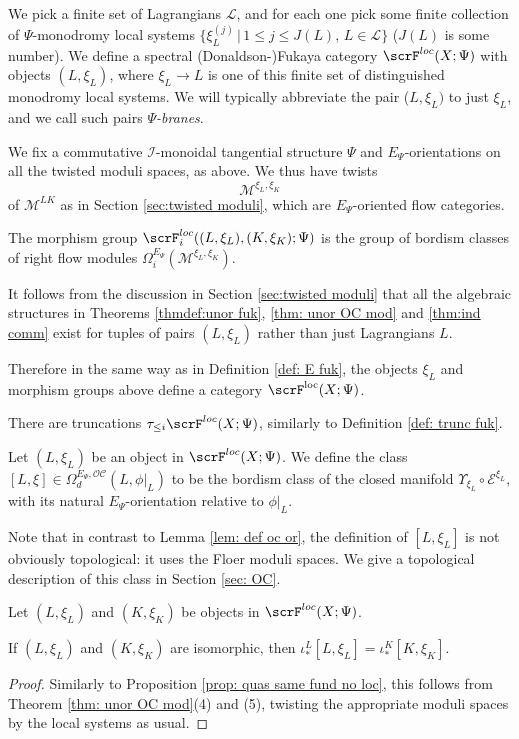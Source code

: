 \documentclass{TPmod}
\DeclareMathOperator{\loc}{loc}
\newcommand{\cC}{\mathcal{C}}
\newcommand{\cE}{\mathcal{E}}
\newcommand{\cI}{\mathcal{I}}
\newcommand{\cL}{\mathcal{L}}
\newcommand{\cM}{\mathcal{M}}
\newcommand{\cO}{\mathcal{O}}
\numberwithin{equation}{section}
\begin{document}
We pick a finite set of Lagrangians $\cL$, and for each one pick some finite collection of $\Psi$-monodromy local systems $\{\xi^{(j)}_L \, | \,  1 \leq j \leq J(L), \, L \in \cL\}$ ($J(L)$ is some number).  We define a spectral (Donaldson-)Fukaya category $\scrF^{loc}(X; \Psi)$ with objects $(L,\xi_L)$, where $\xi_L \to L$ is one of this finite set of distinguished monodromy local systems. We will typically abbreviate the pair ($L,\xi_L)$ to just $\xi_L$, and we call such pairs \emph{$\Psi$-branes}.

We fix a commutative $\cI$-monoidal tangential structure $\Psi$ and $E_\Psi$-orientations on all the twisted moduli spaces, as above. We thus have twists
\[
\cM^{\xi_L,\xi_K}
\]
of $\cM^{LK}$ as in Section \ref{sec:twisted moduli}, which are $E_\Psi$-oriented flow categories.

\begin{defn}
    The morphism group $\scrF^{loc}_i((L,\xi_L), (K,\xi_K); \Psi)$ is the group of bordism classes of right flow modules $\Omega_i^{E_\Psi}(\cM^{\xi_L,\xi_K})$.
\end{defn}

It follows from the discussion in Section \ref{sec:twisted moduli} that all the algebraic structures in Theorems \ref{thmdef:unor fuk}, \ref{thm: unor OC mod} and \ref{thm:ind comm} exist for tuples of pairs $(L, \xi_L)$ rather than just Lagrangians $L$.


Therefore in the same way as in Definition \ref{def: E fuk}, the objects $\xi_L$ and morphism groups above define a category $\scrF^{\loc}(X;\Psi)$.

There are truncations $\tau_{\leq i} \scrF^{loc}(X; \Psi)$, similarly to Definition \ref{def: trunc fuk}.

\begin{defn}\label{def: oc loco}
    Let $(L, \xi_L)$ be an object in $\scrF^{loc}(X; \Psi)$. We define the class $[L, \xi] \in \Omega^{E_\Psi,\cO\cC}_d(L, \phi|_L)$ to be the bordism class of the closed manifold $\Upsilon_{\xi_L} \circ \cE^{\xi_L}$, with its natural $E_\Psi$-orientation relative to $\phi|_L$. 
\end{defn}
\begin{rmk}
    Note that in contrast to Lemma \ref{lem: def oc or}, the definition of $[L,\xi_L]$ is not obviously topological: it uses the Floer moduli spaces. We give a topological description of this class in Section \ref{sec: OC}. 
\end{rmk}
\begin{prop}\label{prop: priojgoierghorhgv}
    Let $(L, \xi_L)$ and $(K, \xi_{K})$ be objects in $\scrF^{loc}(X; \Psi)$.

    If $(L, \xi_L)$ and $(K, \xi_K)$ are isomorphic, then $\iota^L_*[L,\xi_L] = \iota^{K}_*[K,\xi_K]$.
\end{prop}
\begin{proof}
    Similarly to Proposition \ref{prop: quas same fund no loc}, this follows from Theorem \ref{thm: unor OC mod}(4) and (5), twisting the appropriate moduli spaces by the local systems as usual.
\end{proof}
\end{document}
